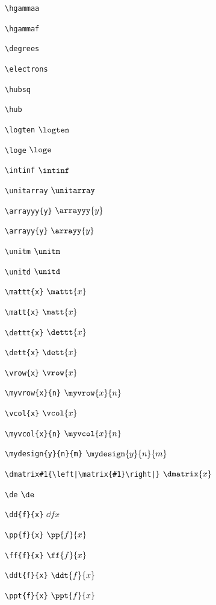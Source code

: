 \verb*+\hgammaa+ \hgammaa


\verb*+\hgammaf+ \hgammaf




\verb*+\degrees+ \degrees


\verb*+\electrons+ \electrons



\verb*+\hubsq+ \hubsq


\verb*+\hub+ \hub



\verb*+\logten+ $\logten$


\verb*+\loge+ $\loge$



\verb*+\intinf+ $\intinf$




\verb*+\unitarray+ $\unitarray$


\verb*+\arrayyy{y}+ $\arrayyy{y}$


\verb*+\arrayy{y}+ $\arrayy{y}$


\verb*+\unitm+ $\unitm$


\verb*+\unitd+ $\unitd$


\verb*+\mattt{x}+ $\mattt{x}$


\verb*+\matt{x}+ $\matt{x}$


\verb*+\dettt{x}+ $\dettt{x}$


\verb*+\dett{x}+ $\dett{x}$


\verb*+\vrow{x}+ $\vrow{x}$


\verb*+\myvrow{x}{n}+ $\myvrow{x}{n}$


\verb*+\vcol{x}+ $\vcol{x}$


\verb*+\myvcol{x}{n}+ $\myvcol{x}{n}$

\verb*+\mydesign{y}{n}{m}+ $\mydesign{y}{n}{m}$

\verb*+\dmatrix#1{\left|\matrix{#1}\right|}+ $\dmatrix{x}$


\verb*+\de+ $\de$


\verb*+\dd{f}{x}+ $\dd{f}{x}$


\verb*+\pp{f}{x}+ $\pp{f}{x}$


\verb*+\ff{f}{x}+ $\ff{f}{x}$


\verb*+\ddt{f}{x}+ $\ddt{f}{x}$


\verb*+\ppt{f}{x}+ $\ppt{f}{x}$



